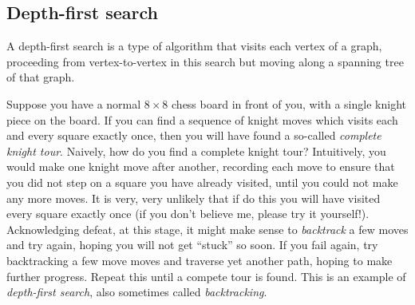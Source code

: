 


\subsection{Depth-first search}

A depth-first search is a type of algorithm that visits each vertex of
a graph, proceeding from vertex-to-vertex in this search but moving
along a spanning tree of that graph.

Suppose you have a normal $8 \times 8$ chess board in front of you,
with a single knight piece on the board. If you can find a sequence of
knight moves which visits each and every square exactly once, then you
will have found a so-called \emph{complete knight tour}.
Naively, how do you find a complete knight tour? Intuitively, you
would make one knight move after another, recording each move to
ensure that you did not step on a square you have already visited,
until you could not make any more moves. It is very, very unlikely
that if do this you will have visited every square exactly once (if
you don't believe me, please try it yourself!). Acknowledging defeat,
at this stage, it might make sense to \emph{backtrack} a few moves and
try again, hoping you will not get ``stuck'' so soon. If you fail
again, try backtracking a few move moves and traverse yet another
path, hoping to make further progress. Repeat this until a compete
tour is found. This is an example of \emph{depth-first search}, also
sometimes called \emph{backtracking}.

